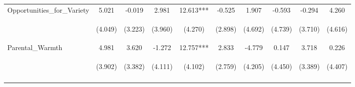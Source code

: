 \begin{tabular}{lccccccccc}
\noalign{\smallskip}Opportunities_for_Variety & 5.021 & -0.019 & 2.981 & 12.613*** & -0.525 & 1.907 & -0.593 & -0.294 & 4.260\\
 & \begin{footnotesize}(4.049)\end{footnotesize} & \begin{footnotesize}(3.223)\end{footnotesize} & \begin{footnotesize}(3.960)\end{footnotesize} & \begin{footnotesize}(4.270)\end{footnotesize} & \begin{footnotesize}(2.898)\end{footnotesize} & \begin{footnotesize}(4.692)\end{footnotesize} & \begin{footnotesize}(4.739)\end{footnotesize} & \begin{footnotesize}(3.710)\end{footnotesize} & \begin{footnotesize}(4.616)\end{footnotesize}\\
\noalign{\smallskip}Parental_Warmth & 4.981 & 3.620 & -1.272 & 12.757*** & 2.833 & -4.779 & 0.147 & 3.718 & 0.226\\
 & \begin{footnotesize}(3.902)\end{footnotesize} & \begin{footnotesize}(3.382)\end{footnotesize} & \begin{footnotesize}(4.111)\end{footnotesize} & \begin{footnotesize}(4.102)\end{footnotesize} & \begin{footnotesize}(2.759)\end{footnotesize} & \begin{footnotesize}(4.205)\end{footnotesize} & \begin{footnotesize}(4.450)\end{footnotesize} & \begin{footnotesize}(3.389)\end{footnotesize} & \begin{footnotesize}(4.407)\end{footnotesize}\\
\noalign{\smallskip}\hline\end{tabular}\\
